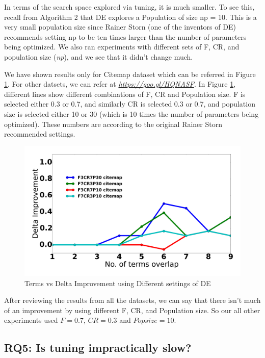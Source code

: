 \documentclass[10pt,conference]{IEEEtran}
\theoremstyle{break}
\begin{document}
In terms of the search space explored via tuning, it is much smaller. To see this, recall from Algorithm 2 that DE explores a Population of size np = 10. This is a very small population size since Rainer Storn (one of the inventors of DE) recommends setting np to be ten times larger than the number of parameters being optimized. We also ran experiments with different sets of F, CR, and population size (\textit{np}), and we see that it didn't change much.

We have shown results only for Citemap dataset which can be referred in Figure \ref{fig:RQ4}. For other datsets, we can refer at \href{https://goo.gl/HQNASF}{\textit{https://goo.gl/HQNASF}}. In Figure \ref{fig:RQ4}, different lines show different combinations of F, CR and Population size. F is selected either 0.3 or 0.7, and similarly CR is selected 0.3 or 0.7, and population size is selected either 10 or 30 (which is 10 times the number of parameters being optimized). These numbers are according to the original Rainer Storn~\cite{storn1997differential} recommended settings.

\begin{figure}[!htbp]
  \includegraphics[width=\linewidth]{./fig/citemap.png}
  \caption{Terms vs Delta Improvement using Different settings of DE}
  \label{fig:RQ4}
\end{figure}

After reviewing the results from all the datasets, we can say that there isn't much of an improvement by using different F, CR, and Population size. So our all other experiments used $F=0.7$, $CR=0.3$ and $Pop size = 10$.

\subsection{\textbf{RQ5: Is tuning impractically slow?}}
\end{document}
